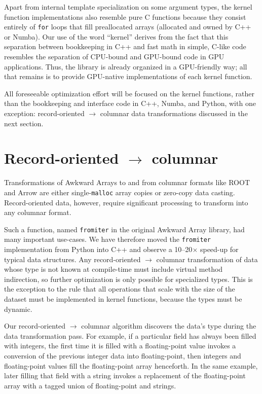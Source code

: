 \documentclass{webofc}
\begin{document}
Apart from internal template specialization on some argument types, the kernel function implementations also resemble pure C functions because they consist entirely of \texttt{for} loops that fill preallocated arrays (allocated and owned by C++ or Numba). Our use of the word ``kernel'' derives from the fact that this separation between bookkeeping in C++ and fast math in simple, C-like code resembles the separation of CPU-bound and GPU-bound code in GPU applications. Thus, the library is already organized in a GPU-friendly way; all that remains is to provide GPU-native implementations of each kernel function.

All foreseeable optimization effort will be focused on the kernel functions, rather than the bookkeeping and interface code in C++, Numba, and Python, with one exception: record-oriented $\to$ columnar data transformations discussed in the next section.

\section{Record-oriented $\to$ columnar}
\label{lab:fillablearray}

Transformations of Awkward Arrays to and from columnar formats like ROOT and Arrow are either single-\texttt{malloc} array copies or zero-copy data casting. Record-oriented data, however, require significant processing to transform into any columnar format.

Such a function, named \texttt{fromiter} in the original Awkward Array library, had many important use-cases. We have therefore moved the \texttt{fromiter} implementation from Python into C++ and observe a 10--20$\times$ speed-up for typical data structures. Any record-oriented $\to$ columnar transformation of data whose type is not known at compile-time must include virtual method indirection, so further optimization is only possible for specialized types. This is the exception to the rule that all operations that scale with the size of the dataset must be implemented in kernel functions, because the types must be dynamic.

Our record-oriented $\to$ columnar algorithm discovers the data's type during the data transformation pass. For example, if a particular field has always been filled with integers, the first time it is filled with a floating-point value invokes a conversion of the previous integer data into floating-point, then integers and floating-point values fill the floating-point array henceforth. In the same example, later filling that field with a string invokes a replacement of the floating-point array with a tagged union of floating-point and strings.
\end{document}
